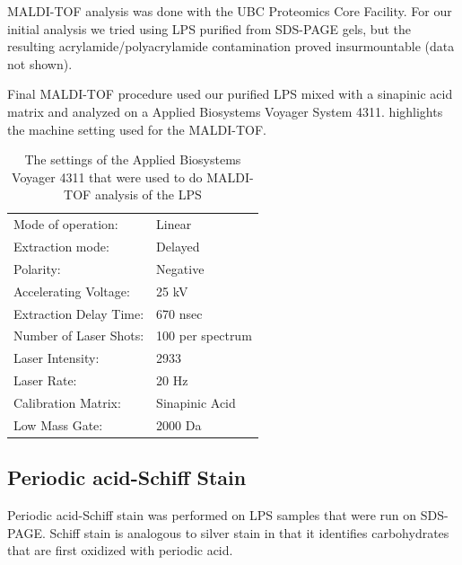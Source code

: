     \ac{MALDI-TOF} analysis was done with the UBC Proteomics Core Facility. For our initial analysis we tried using \ac{LPS} purified from \ac{SDS-PAGE} gels, but the resulting acrylamide/polyacrylamide contamination proved insurmountable (data not shown). 

    Final \ac{MALDI-TOF} procedure used our purified \ac{LPS} mixed with a sinapinic acid matrix and analyzed on a Applied Biosystems Voyager System 4311.  highlights the machine setting used for the \ac{MALDI-TOF}.
     
    \begin{table}[htb]
      \centering
      \caption[\ac{MALDI-TOF} settings]{The settings of the Applied Biosystems Voyager 4311 that were used to do \ac{MALDI-TOF} analysis of the \caulobacter{} \ac{LPS}}
      \label{tab:mssettings}
      \begin{tabular}{ll}
        \toprule
        Mode of operation:     & Linear           \\
        Extraction mode:       & Delayed          \\
        Polarity:              & Negative         \\
        Accelerating Voltage:  & 25 kV            \\
        Extraction Delay Time: & 670 nsec         \\
        Number of Laser Shots: & 100 per spectrum \\
        Laser Intensity:       & 2933             \\
        Laser Rate:            & 20 Hz            \\
        Calibration Matrix:    & Sinapinic Acid    \\
        Low Mass Gate:         & 2000 Da      \\   \bottomrule
      \end{tabular}
    \end{table}

    \subsection{Periodic acid-Schiff Stain} %
    \label{sub:schiff_stain}
		
    Periodic   acid-Schiff   stain   was   performed   on  \ac{LPS}   samples   that   were   run   on
    \ac{SDS-PAGE}. Schiff stain is analogous to silver  stain in that it identifies carbohydrates that
    are first oxidized with periodic acid.

